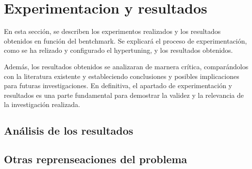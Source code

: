 \section{Experimentacion y resultados}
En esta sección, se describen los experimentos realizados y los resultados
obtenidos en función del bentchmark. Se explicará el proceso de experimentación,
como se ha relizado y configurado el hypertuning, y los resultados obtenidos.\medskip

Además, los resultados obtenidos se analizaran de marnera crítica, 
comparándolos con la literatura existente y estableciendo conclusiones y 
posibles implicaciones para futuras investigaciones. En definitiva, el 
apartado de experimentación y resultados es una parte fundamental para 
demostrar la validez y la relevancia de la investigación realizada.


\subsection{Análisis de los resultados}
\subsection{Otras reprenseaciones del problema}

\pagebreak
